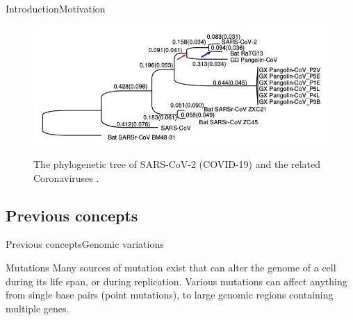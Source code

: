 \documentclass[10pt]{beamer}
\begin{document}
{%
\begin{frame}{Introduction}{Motivation}
\begin{figure}[]
 \centering
    \includegraphics[width=\textwidth,height=0.7\textheight,keepaspectratio]{img/alignment/phylocovid.jpg}
    \label{img:mot2}
    \caption{The phylogenetic tree of SARS-CoV-2 (COVID-19) and the related Coronaviruses  \cite{tang2020origin}.}
\end{figure}
\end{frame}

\subsection{Previous concepts}

\begin{frame}{Previous concepts}{Genomic variations}
	\begin{block}{Mutations}
		Many sources of mutation exist that can alter the genome of a cell during its life span, or during replication. Various mutations can affect anything from single base pairs (point mutations), to large genomic regions containing multiple genes.
	\end{block}
\end{frame}



}
\end{document}

